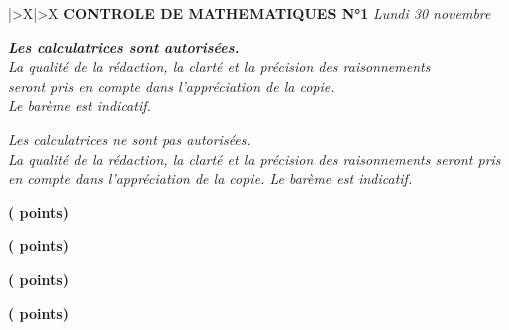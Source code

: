 \documentclass[12pt,french]{book}
\begin{document}
\begin{tabularx}{\linewidth}{|>\centering X|>\centering X}
\hline 
\textbf{CONTROLE DE MATHEMATIQUES N°1} \tabularnewline 
\textit{Lundi 30 novembre} \tabularnewline
\hline
\end{tabularx} 



\begin{spacing}{1.2} %


\begin{center}
\textit{\textbf{Les calculatrices sont autorisées.}}\\
\textit{La qualité de la rédaction, la clarté et la précision des raisonnements}\\
\textit{seront pris en compte dans l'appréciation de la copie.}\\
\textit{Le barème est indicatif.}
\end{center}

\thispagestyle{garde_controle}


\begin{center}
\begin{minipage}{0.8\linewidth}
\begin{center}
\textit{Les calculatrices ne sont pas autorisées.\\
La qualité de la rédaction, la clarté et la précision des raisonnements seront pris en compte dans l'appréciation de la copie.
Le barème est indicatif.}
\end{center}
\end{minipage}
\end{center}

\noindent

\exercice \hfill \textbf{( points)}

\medskip

\exercice \hfill \textbf{( points)}

\medskip

\exercice \hfill \textbf{( points)}

\medskip

\exercice \hfill \textbf{( points)}

\medskip



\end{spacing}
\end{document}
